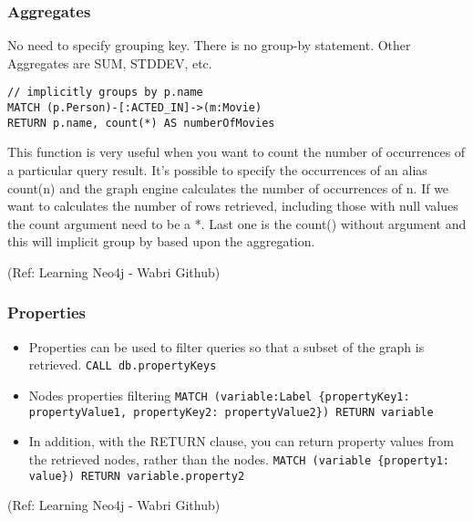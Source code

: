 \begin{frame}[fragile]\frametitle{Aggregates}

No need to specify grouping key. There is no group-by statement. Other Aggregates are SUM, STDDEV, etc.


\begin{lstlisting}
// implicitly groups by p.name
MATCH (p.Person)-[:ACTED_IN]->(m:Movie)
RETURN p.name, count(*) AS numberOfMovies
\end{lstlisting}	  


This function is very useful when you want to count the number of occurrences of a particular query result. It's possible to specify the occurrences of an alias count(n) and the graph engine calculates the number of occurrences of n. If we want to calculates the number of rows retrieved, including those with null values the count argument need to be a *. Last one is the count() without argument and this will implicit group by based upon the aggregation.

{\tiny (Ref: Learning Neo4j - Wabri Github)}

\end{frame}

\begin{frame}\frametitle{Properties }

\begin{itemize}
\item Properties can be used to filter queries so that a subset of the graph is retrieved. \lstinline|CALL db.propertyKeys|
\item Nodes properties filtering \lstinline|MATCH (variable:Label {propertyKey1: propertyValue1, propertyKey2: propertyValue2}) RETURN variable|
\item In addition, with the RETURN clause, you can return property values from the retrieved nodes, rather than the nodes. \lstinline|MATCH (variable {property1: value}) RETURN variable.property2|
\end{itemize}


{\tiny (Ref: Learning Neo4j - Wabri Github)}
\end{frame}




